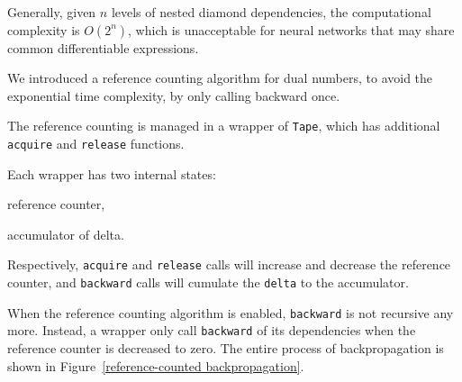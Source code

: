 Generally, given $n$ levels of nested diamond dependencies, the computational complexity is $O(2^n)$, which is unacceptable for neural networks that may share common \glspl{differentiable expression}.

We introduced a reference counting algorithm for dual numbers, to avoid the exponential time complexity, by only calling backward once.

The reference counting is managed in a wrapper of \lstinline{Tape}, which has additional \lstinline{acquire} and \lstinline{release} functions.

Each wrapper has two internal states:
\begin{enumerate*}
  \item reference counter,
  \item accumulator of delta.
\end{enumerate*}
Respectively, \lstinline{acquire} and \lstinline{release} calls will increase and decrease the reference counter, and \lstinline{backward} calls will cumulate the \lstinline{delta} to the accumulator.

When the reference counting algorithm is enabled, \lstinline{backward} is not recursive any more. Instead, a wrapper only call \lstinline{backward} of its dependencies when the reference counter is decreased to zero. The entire process of backpropagation is shown in Figure~\ref{reference-counted backpropagation}.

